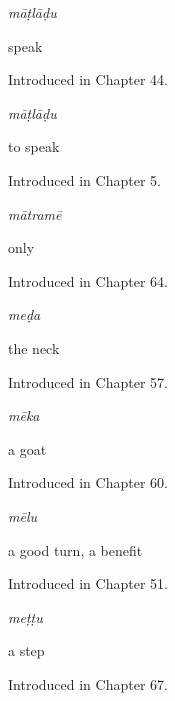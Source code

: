 \noindent\begin{minipage}[t]{\linewidth}
\raggedright
\textbf{}\enspace\emph{māṭlāḍu}\par
\small speak\par
\footnotesize Introduced in Chapter 44.
\end{minipage}\par\medskip

\noindent\begin{minipage}[t]{\linewidth}
\raggedright
\textbf{}\enspace\emph{māṭlāḍu}\par
\small to speak\par
\footnotesize Introduced in Chapter 5.
\end{minipage}\par\medskip

\noindent\begin{minipage}[t]{\linewidth}
\raggedright
\textbf{}\enspace\emph{mātramē}\par
\small only\par
\footnotesize Introduced in Chapter 64.
\end{minipage}\par\medskip

\noindent\begin{minipage}[t]{\linewidth}
\raggedright
\textbf{}\enspace\emph{meḍa}\par
\small the neck\par
\footnotesize Introduced in Chapter 57.
\end{minipage}\par\medskip

\noindent\begin{minipage}[t]{\linewidth}
\raggedright
\textbf{}\enspace\emph{mēka}\par
\small a goat\par
\footnotesize Introduced in Chapter 60.
\end{minipage}\par\medskip

\noindent\begin{minipage}[t]{\linewidth}
\raggedright
\textbf{}\enspace\emph{mēlu}\par
\small a good turn, a benefit\par
\footnotesize Introduced in Chapter 51.
\end{minipage}\par\medskip

\noindent\begin{minipage}[t]{\linewidth}
\raggedright
\textbf{}\enspace\emph{meṭṭu}\par
\small a step\par
\footnotesize Introduced in Chapter 67.
\end{minipage}\par\medskip

